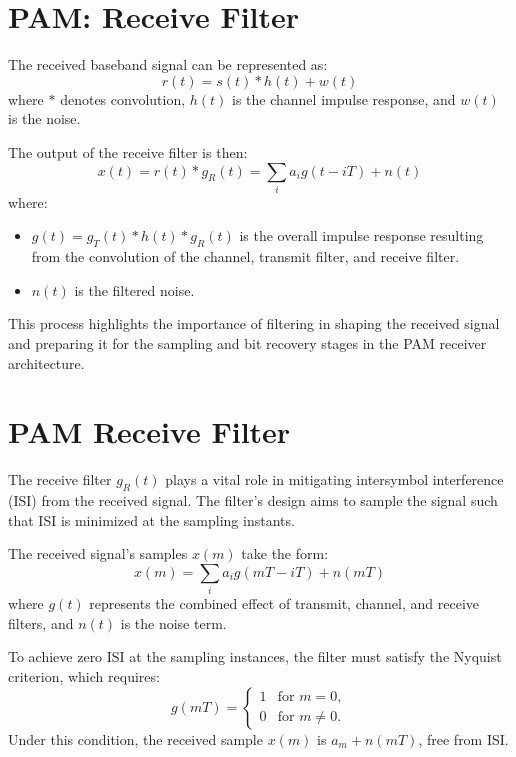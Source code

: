 \section*{PAM: Receive Filter}

The received baseband signal can be represented as:
\[ r(t) = s(t) * h(t) + w(t) \]
where \( * \) denotes convolution, \( h(t) \) is the channel impulse response, and \( w(t) \) is the noise.

The output of the receive filter is then:
\[ x(t) = r(t) * g_R(t) = \sum_i a_i g(t - iT) + n(t) \]
where:
\begin{itemize}
    \item \( g(t) = g_T(t) * h(t) * g_R(t) \) is the overall impulse response resulting from the convolution of the channel, transmit filter, and receive filter.
    \item \( n(t) \) is the filtered noise.
\end{itemize}

This process highlights the importance of filtering in shaping the received signal and preparing it for the sampling and bit recovery stages in the PAM receiver architecture.


\section*{PAM Receive Filter}

The receive filter \( g_R(t) \) plays a vital role in mitigating intersymbol interference (ISI) from the received signal. The filter's design aims to sample the signal such that ISI is minimized at the sampling instants.

The received signal's samples \( x(m) \) take the form:
\[ x(m) = \sum_i a_i g(mT - iT) + n(mT) \]
where \( g(t) \) represents the combined effect of transmit, channel, and receive filters, and \( n(t) \) is the noise term.

To achieve zero ISI at the sampling instances, the filter must satisfy the Nyquist criterion, which requires:
\[ g(mT) =
\begin{cases}
1 & \text{for } m = 0, \\
0 & \text{for } m \neq 0.
\end{cases} \]
Under this condition, the received sample \( x(m) \) is \( a_m + n(mT) \), free from ISI.

